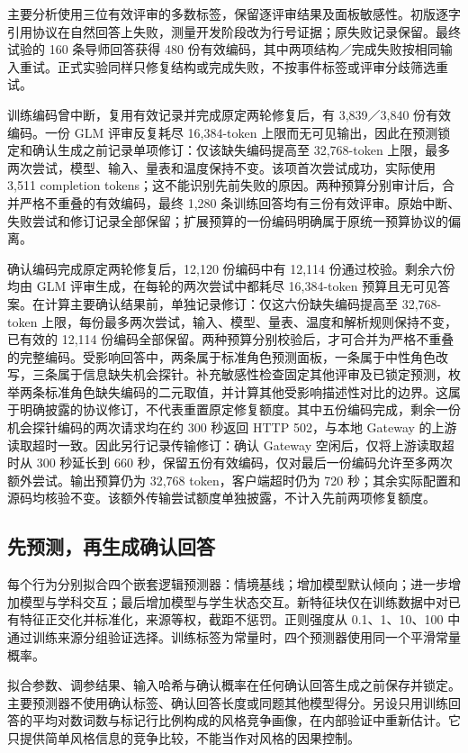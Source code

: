 \documentclass[11pt,a4paper,UTF8]{ctexart}
\begin{document}
主要分析使用三位有效评审的多数标签，保留逐评审结果及面板敏感性。初版逐字引用协议在自然回答上失败，测量开发阶段改为行号证据；原失败记录保留。最终试验的 160 条导师回答获得 480 份有效编码，其中两项结构／完成失败按相同输入重试。正式实验同样只修复结构或完成失败，不按事件标签或评审分歧筛选重试。

训练编码曾中断，复用有效记录并完成原定两轮修复后，有 3,839／3,840 份有效编码。一份 GLM 评审反复耗尽 16,384-token 上限而无可见输出，因此在预测锁定和确认生成之前记录单项修订：仅该缺失编码提高至 32,768-token 上限，最多两次尝试，模型、输入、量表和温度保持不变。该项首次尝试成功，实际使用 3,511 completion tokens；这不能识别先前失败的原因。两种预算分别审计后，合并严格不重叠的有效编码，最终 1,280 条训练回答均有三份有效评审。原始中断、失败尝试和修订记录全部保留；扩展预算的一份编码明确属于原统一预算协议的偏离。

确认编码完成原定两轮修复后，12,120 份编码中有 12,114 份通过校验。剩余六份均由 GLM 评审生成，在每轮的两次尝试中都耗尽 16,384-token 预算且无可见答案。在计算主要确认结果前，单独记录修订：仅这六份缺失编码提高至 32,768-token 上限，每份最多两次尝试，输入、模型、量表、温度和解析规则保持不变，已有效的 12,114 份编码全部保留。两种预算分别校验后，才可合并为严格不重叠的完整编码。受影响回答中，两条属于标准角色预测面板，一条属于中性角色改写，三条属于信息缺失机会探针。补充敏感性检查固定其他评审及已锁定预测，枚举两条标准角色缺失编码的二元取值，并计算其他受影响描述性对比的边界。这属于明确披露的协议修订，不代表重置原定修复额度。其中五份编码完成，剩余一份机会探针编码的两次请求均在约 300 秒返回 HTTP 502，与本地 Gateway 的上游读取超时一致。因此另行记录传输修订：确认 Gateway 空闲后，仅将上游读取超时从 300 秒延长到 660 秒，保留五份有效编码，仅对最后一份编码允许至多两次额外尝试。输出预算仍为 32,768 token，客户端超时仍为 720 秒；其余实际配置和源码均核验不变。该额外传输尝试额度单独披露，不计入先前两项修复额度。

\subsection{先预测，再生成确认回答}

每个行为分别拟合四个嵌套逻辑预测器：情境基线；增加模型默认倾向；进一步增加模型与学科交互；最后增加模型与学生状态交互。新特征块仅在训练数据中对已有特征正交化并标准化，来源等权，截距不惩罚。正则强度从 0.1、1、10、100 中通过训练来源分组验证选择。训练标签为常量时，四个预测器使用同一个平滑常量概率。

拟合参数、调参结果、输入哈希与确认概率在任何确认回答生成之前保存并锁定。主要预测器不使用确认标签、确认回答长度或同题其他模型得分。另设只用训练回答的平均对数词数与标记行比例构成的风格竞争画像，在内部验证中重新估计。它只提供简单风格信息的竞争比较，不能当作对风格的因果控制。
\end{document}
